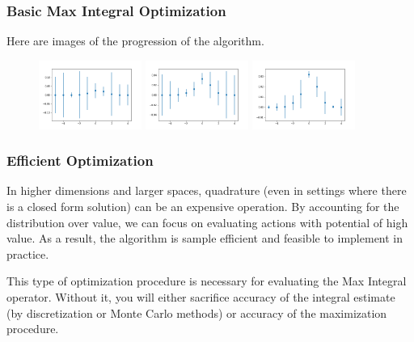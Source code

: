 \documentclass[9pt]{beamer}
\begin{document}
\begin{frame}
\frametitle{Basic Max Integral Optimization}
Here are images of the progression of the algorithm.
\begin{figure}
   \includegraphics[width=0.3\textwidth]{im1}
   \hfill
   \includegraphics[width=0.3\textwidth]{im2}
   \hfill
   \includegraphics[width=0.3\textwidth]{im3}
\end{figure}
\end{frame}


\begin{frame}
\frametitle{Efficient Optimization}
In higher dimensions and larger spaces, quadrature (even in settings where there is a closed form solution) can be an expensive operation. By accounting for the distribution over value, we can focus on evaluating actions with potential of high value. As a result, the algorithm is sample efficient and feasible to implement in practice.\newline

This type of optimization procedure is necessary for evaluating the Max Integral operator. Without it, you will either sacrifice accuracy of the integral estimate (by discretization or Monte Carlo methods) or accuracy of the maximization procedure.\newline \newline
\end{frame}
\end{document}
